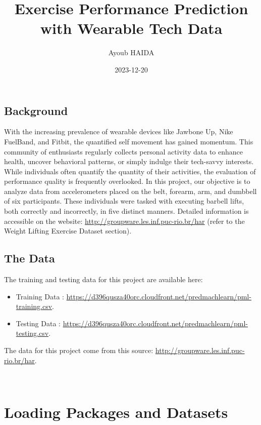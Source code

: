 \documentclass[
]{article}
\title{Exercise Performance Prediction with Wearable Tech Data}
\author{Ayoub HAIDA}
\date{2023-12-20}
\begin{document}
\maketitle

\hypertarget{background}{%
\subsection{Background}\label{background}}

With the increasing prevalence of wearable devices like Jawbone Up, Nike
FuelBand, and Fitbit, the quantified self movement has gained momentum.
This community of enthusiasts regularly collects personal activity data
to enhance health, uncover behavioral patterns, or simply indulge their
tech-savvy interests. While individuals often quantify the quantity of
their activities, the evaluation of performance quality is frequently
overlooked. In this project, our objective is to analyze data from
accelerometers placed on the belt, forearm, arm, and dumbbell of six
participants. These individuals were tasked with executing barbell
lifts, both correctly and incorrectly, in five distinct manners.
Detailed information is accessible on the website:
\url{http://groupware.les.inf.puc-rio.br/har} (refer to the Weight
Lifting Exercise Dataset section).

\hypertarget{the-data}{%
\subsection{The Data}\label{the-data}}

The training and testing data for this project are available here:

\begin{itemize}
\item
  Training Data :
  \url{https://d396qusza40orc.cloudfront.net/predmachlearn/pml-training.csv}.
\item
  Testing Data :
  \url{https://d396qusza40orc.cloudfront.net/predmachlearn/pml-testing.csv}.
\end{itemize}

The data for this project come from this source:
\url{http://groupware.les.inf.puc-rio.br/har}.\\
\strut \\

\hypertarget{loading-packages-and-datasets}{%
\section{Loading Packages and
Datasets}\label{loading-packages-and-datasets}}
\end{document}
